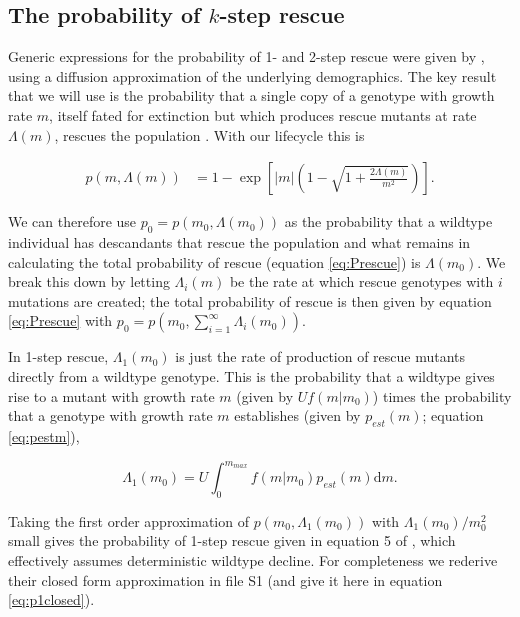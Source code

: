 \documentclass[9pt,twocolumn,twoside,lineno]{gsajnl}
\begin{document}
\subsection{The probability of $k$-step rescue}

Generic expressions for the probability of 1- and 2-step rescue were given by \cite{Martin2013}, using a diffusion approximation of the underlying demographics.
The key result that we will use is the probability that a single copy of a genotype with growth rate $m$, itself fated for extinction but which produces rescue mutants at rate $\Lambda(m)$, rescues the population \citep[equation S1.5 in][]{Martin2013}.
With our lifecycle this is \citep[c.f., equation A.3 in][]{Iwasa2004}

\begin{equation}\label{eq:S15}
\begin{aligned}
p(m,\Lambda(m)) 
   &= 1 - \exp \left[  |m| \left(1 - \sqrt{1+\frac{2\Lambda(m)}{m^2}} \right) \right].
\end{aligned}
\end{equation}

\noindent We can therefore use $p_0 = p(m_0,\Lambda(m_0))$ as the probability that a wildtype individual has descandants that rescue the population and what remains in calculating the total probability of rescue (equation \ref{eq:Prescue}) is $\Lambda(m_0)$.
We break this down by letting $\Lambda_i(m)$ be the rate at which rescue genotypes with $i$ mutations are created; the total probability of rescue is then given by equation \ref{eq:Prescue} with $p_0=p(m_0, \sum_{i=1}^\infty\Lambda_i(m_0))$.


In 1-step rescue, $\Lambda_1(m_0)$ is just the rate of production of rescue mutants directly from a wildtype genotype.
This is the probability that a wildtype gives rise to a mutant with growth rate $m$ (given by $U f(m|m_0)$) times the probability that a genotype with growth rate $m$ establishes (given by $p_{est}(m)$; equation \ref{eq:pestm}),

\begin{equation}\label{eq:Lambda1}
\Lambda_1(m_0) = U \int_0^{m_{max}} f(m|m_0) p_{est}(m) \mathrm{d}m.
\end{equation}

\noindent Taking the first order approximation of $p(m_0,\Lambda_1(m_0))$ with $\Lambda_1(m_0)/m_0^2$ small gives the probability of 1-step rescue given in equation 5 of \cite{Anciaux2018}, which effectively assumes deterministic wildtype decline.
For completeness we rederive their closed form approximation in file S1 (and give it here in equation \ref{eq:p1closed}).
\end{document}
